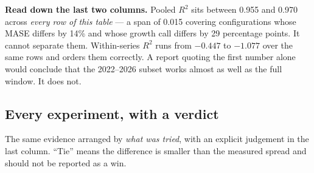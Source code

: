 \documentclass[11pt,a4paper]{article}
\newcommand{\keypoint}[1]{%
  \par\vspace{0.4em}%
  \noindent\colorbox{fed!8}{\parbox{0.98\textwidth}{\vspace{0.2em}#1\vspace{0.2em}}}%
  \par\vspace{0.4em}}
\begin{document}
\keypoint{\textbf{Read down the last two columns.} Pooled $R^2$ sits between 0.955 and 0.970 across
\emph{every row of this table} --- a span of 0.015 covering configurations whose MASE differs by 14\%
and whose growth call differs by 29 percentage points. It cannot separate them. Within-series $R^2$
runs from $-0.447$ to $-1.077$ over the same rows and orders them correctly. A report quoting the
first number alone would conclude that the 2022--2026 subset works almost as well as the full window.
It does not.}

\subsection{Every experiment, with a verdict}

The same evidence arranged by \emph{what was tried}, with an explicit judgement in the last column.
``Tie'' means the difference is smaller than the measured spread and should not be reported as a win.
\end{document}
